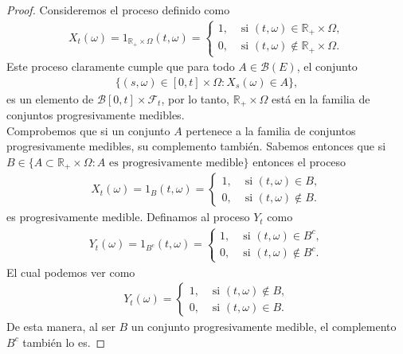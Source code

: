 \begin{proof}
	Consideremos el proceso definido como
    \begin{align*}
	X_t (\omega) = 1_{\mathbb{R}_+ \times \Omega} (t, \omega) = 
    \begin{cases}
    1, & \text{ si } (t, \omega) \in \mathbb{R}_+ \times \Omega, \\
    0, & \text{ si } (t, \omega) \notin \mathbb{R}_+ \times \Omega.
	\end{cases}
	\end{align*}
Este proceso claramente cumple que para todo $A \in \mathcal{B}(E)$, el conjunto
\begin{align*}
\{ (s, \omega) \in [0, t] \times \Omega : X_s(\omega) \in A \},
\end{align*}
es un elemento de $\mathcal{B}[0, t] \times \mathcal{F}_t$, por lo tanto, $\mathbb{R}_+ \times \Omega$ está en la familia de conjuntos progresivamente medibles. \\

Comprobemos que si un conjunto $A$ pertenece a la familia de conjuntos progresivamente medibles, su complemento también. Sabemos entonces que si $B \in \{ A \subset \mathbb{R}_{+} \times \Omega : A \text{ es progresivamente medible} \}$ entonces el proceso
    \begin{align*}
	X_t (\omega) = 1_{B} (t, \omega) = 
    \begin{cases}
    1, & \text{ si } (t, \omega) \in B, \\
    0, & \text{ si } (t, \omega) \notin B.
	\end{cases}
	\end{align*}
es progresivamente medible. Definamos al proceso $Y_t$ como
    \begin{align*}
	Y_t (\omega) = 1_{B^{c}} (t, \omega) = 
    \begin{cases}
    1, & \text{ si } (t, \omega) \in B^{c}, \\
    0, & \text{ si } (t, \omega) \notin B^{c}.
	\end{cases}
	\end{align*}
El cual podemos ver como
    \begin{align*}
	Y_t (\omega) = 
    \begin{cases}
    1, & \text{ si } (t, \omega) \notin B, \\
    0, & \text{ si } (t, \omega) \in B.
	\end{cases}
	\end{align*}
De esta manera, al ser $B$ un conjunto progresivamente medible, el complemento $B^{c}$ también lo es.


\end{proof}
